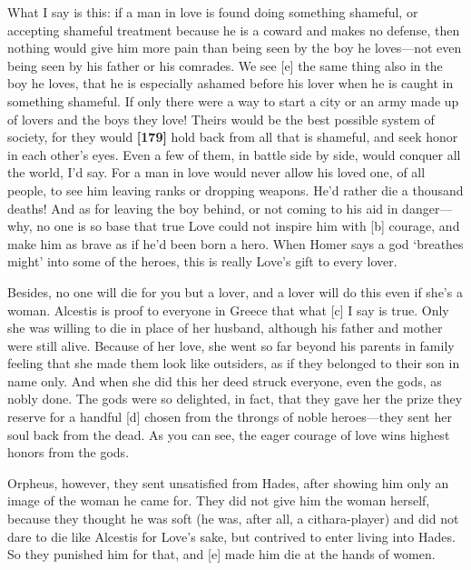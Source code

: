 What I say is this: if a man in love is found doing something shameful,
or accepting shameful treatment because he is a coward and makes no
defense, then nothing would give him more pain than being seen by the
boy he loves---not even being seen by his father or his comrades. We see
{[}e{]} the same thing also in the boy he loves, that he is especially
ashamed before his lover when he is caught in something shameful. If
only there were a way to start a city or an army made up of lovers and
the boys they love! Theirs would be the best possible system of society,
for they would {\bf {[}179{]}} hold back from all that is shameful, and
seek honor in each other's
eyes. Even a few of
them, in battle side by side, would conquer all the world, I'd say. For
a man in love would never allow his loved one, of all people, to see him
leaving ranks or dropping weapons. He'd rather die a thousand deaths!
And as for leaving the boy behind, or not coming to his aid in
danger---why, no one is so base that true Love could not inspire him
with {[}b{]} courage, and make him as brave as if he'd been born a hero.
When Homer says a god ‘breathes might' into some of the heroes, this is
really Love's gift to every
lover.

Besides, no one will die for you but a lover, and a lover will do this
even if she's a woman. Alcestis is proof to everyone in Greece that what
{[}c{]} I say is
true. Only she was
willing to die in place of her husband, although his father and mother
were still alive. Because of her love, she went so far beyond his
parents in family feeling that she made them look like outsiders, as if
they belonged to their son in name only. And when she did this her deed
struck everyone, even the gods, as nobly done. The gods were so
delighted, in fact, that they gave her the prize they reserve for a
handful {[}d{]} chosen from the throngs of noble heroes---they sent her
soul back from the dead. As you can see, the eager courage of love wins
highest honors from the gods.

Orpheus, however, they sent unsatisfied from Hades, after showing him
only an image of the woman he came for. They did not give him the woman
herself, because they thought he was soft (he was, after all, a
cithara-player) and did not dare to die like Alcestis for Love's sake,
but contrived to enter living into Hades. So they punished him for that,
and {[}e{]} made him die at the hands of
women.

